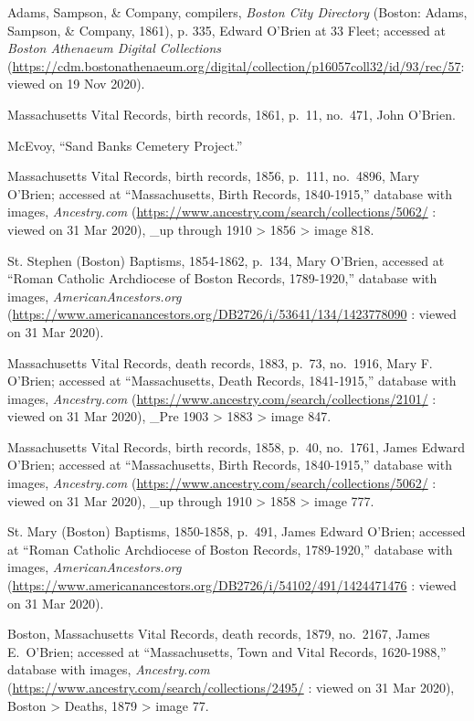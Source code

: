 \begin{thebibliography}{999}
Adams, Sampson, \& Company, compilers, \textit{Boston City Directory} (Boston: Adams, Sampson, \& Company, 1861), p. 335, Edward O'Brien at 33 Fleet; accessed at \textit{Boston Athenaeum Digital Collections} (\url{https://cdm.bostonathenaeum.org/digital/collection/p16057coll32/id/93/rec/57}: viewed on 19 Nov 2020).

Massachusetts Vital Records, birth records, 1861, p.\ 11, no.\ 471, John O'Brien.

McEvoy, ``Sand Banks Cemetery Project.'' 

Massachusetts Vital Records, birth records, 1856, p.\ 111, no.\ 4896, Mary O'Brien; accessed at ``Massachusetts, Birth Records, 1840-1915,'' database with images, \textit{Ancestry.com} (\url{https://www.ancestry.com/search/collections/5062/} : viewed on 31 Mar 2020), \_up through 1910 > 1856 > image 818.

St. Stephen (Boston) Baptisms, 1854-1862, p.\ 134, Mary O'Brien, accessed at ``Roman Catholic Archdiocese of Boston Records, 1789-1920,'' database with images, \textit{AmericanAncestors.org} (\url{https://www.americanancestors.org/DB2726/i/53641/134/1423778090} : viewed on 31 Mar 2020).

Massachusetts Vital Records, death records, 1883, p.\ 73, no.\ 1916, Mary F. O'Brien; accessed at ``Massachusetts, Death Records, 1841-1915,'' database with images, \textit{Ancestry.com} (\url{https://www.ancestry.com/search/collections/2101/} : viewed on 31 Mar 2020), \_Pre 1903 > 1883 > image 847.

Massachusetts Vital Records, birth records, 1858, p.\ 40, no.\ 1761, James Edward O'Brien; accessed at ``Massachusetts, Birth Records, 1840-1915,'' database with images, \textit{Ancestry.com} (\url{https://www.ancestry.com/search/collections/5062/} : viewed on 31 Mar 2020), \_up through 1910 > 1858 > image 777.

St. Mary (Boston) Baptisms, 1850-1858, p.\ 491, James Edward O'Brien; accessed at ``Roman Catholic Archdiocese of Boston Records, 1789-1920,'' database with images, \textit{AmericanAncestors.org} (\url{https://www.americanancestors.org/DB2726/i/54102/491/1424471476} : viewed on 31 Mar 2020).

Boston, Massachusetts Vital Records, death records, 1879, no.\ 2167, James E.\ O'Brien; accessed at ``Massachusetts, Town and Vital Records, 1620-1988,'' database with images, \textit{Ancestry.com} (\url{https://www.ancestry.com/search/collections/2495/} : viewed on 31 Mar 2020), Boston > Deaths, 1879 > image 77.


\end{thebibliography}

